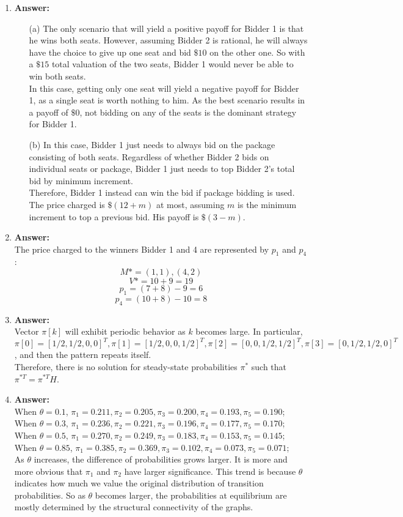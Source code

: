 \documentclass[12pt]{article}
\begin{document}
\begin{enumerate}
\item{} \textbf{Answer:}
\begin{itemize}
\item[(a)] The only scenario that will yield a positive payoff for Bidder 1 is that he wins both seats. However, assuming Bidder 2 is rational, he will always have the choice to give up one seat and bid $\$10$ on the other one. So with a $\$15$ total valuation of the two seats, Bidder 1 would never be able to win both seats.
\medskip\\
In this case, getting only one seat will yield a negative payoff for Bidder 1, as a single seat is worth nothing to him. As the best scenario results in a payoff of $\$0$, not bidding on any of the seats is the dominant strategy for Bidder 1.
\item[(b)] In this case, Bidder 1 just needs to always bid on the package consisting of both seats. Regardless of whether Bidder 2 bids on individual seats or package, Bidder 1 just needs to top Bidder 2's total bid by minimum increment.
\medskip\\
Therefore, Bidder 1 instead can win the bid if package bidding is used. The price charged is $\$(12+m)$ at most, assuming $m$ is the minimum increment to top a previous bid. His payoff is $\$(3-m)$.
\end{itemize}

\item{} \textbf{Answer:}
\medskip\\
The price charged to the winners Bidder 1 and 4 are represented by $p_1$ and $p_4$:
$$M*={(1,1),(4,2)}$$
$$V*=10+9=19$$
$$p_1=(7+8)-9=6$$
$$p_4=(10+8)-10=8$$

\item{} \textbf{Answer:}
\medskip\\
Vector $\pi[k]$ will exhibit periodic behavior as $k$ becomes large. In particular, $\pi[0]=[1/2,1/2,0,0]^T, \pi[1]=[1/2,0,0,1/2]^T,\pi[2]=[0,0,1/2,1/2]^T,\pi[3]=[0,1/2,1/2,0]^T$, and then the pattern repeats itself.
\medskip\\
Therefore, there is no solution for steady-state probabilities $\pi^*$ such that $\pi^{*T}=\pi^{*T}H$.

\item{} \textbf{Answer:}
\medskip\\
When $\theta=0.1$, $\pi_1=0.211, \pi_2=0.205, \pi_3=0.200, \pi_4=0.193, \pi_5=0.190$;\\
When $\theta=0.3$, $\pi_1=0.236, \pi_2=0.221, \pi_3=0.196, \pi_4=0.177, \pi_5=0.170$;\\
When $\theta=0.5$, $\pi_1=0.270, \pi_2=0.249, \pi_3=0.183, \pi_4=0.153, \pi_5=0.145$;\\
When $\theta=0.85$, $\pi_1=0.385, \pi_2=0.369, \pi_3=0.102, \pi_4=0.073, \pi_5=0.071$;
\medskip\\
As $\theta$ increases, the difference of probabilities grows larger. It is more and more obvious that $\pi_1$ and $\pi_2$ have larger significance. This trend is because $\theta$ indicates how much we value the original distribution of transition probabilities. So as $\theta$ becomes larger, the probabilities at equilibrium are mostly determined by the structural connectivity of the graphs.


\end{enumerate}
\end{document}
